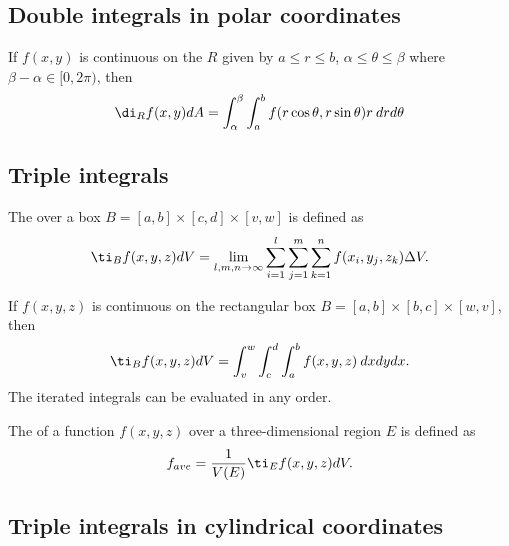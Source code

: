 \documentclass{article}
\begin{document}
\subsection{Double integrals in polar coordinates}


\begin{theorem}
    If $f(x,y)$ is continuous on the  $R$
    given by $a\leq r \leq b$, $\alpha \leq \theta\leq \beta$ where
    $\beta-\alpha \in [0,2\pi)$, then
    \begin{align*}
        \di_R f(x,y)dA = \int_\alpha^\beta \int_a^b
        f(r\cos\theta, r\sin\theta)r\:drd\theta
    \end{align*}
\end{theorem}


\subsection{Triple integrals} 


\begin{definition}
    The  over a box $B=[a,b]\times[c,d]\times[v,w]$
    is defined as
    \begin{align*}
        \ti_B f(x,y,z)dV = \lim_{l,m,n\to\infty}\sum_{i=1}^l \sum_{j=1}^m \sum_{k=1}^n
        f(x_i,y_j,z_k)\Delta V.
    \end{align*}
\end{definition}
\begin{theorem}
    If $f(x,y,z)$ is continuous on the rectangular box $B=[a,b]\times[b,c]\times[w,v]$,
    then 
    \begin{align*}
        \ti_B f(x,y,z) dV = \int_v^w\int_c^d \int_a^b f(x,y,z)\:dxdydx.
    \end{align*} 
    The iterated integrals can be evaluated in any order.
\end{theorem}
\begin{definition}
    The  of a function $f(x,y,z)$ over a three-dimensional region $E$
    is defined as
    \begin{align*}
        f_{ave} = \frac{1}{V(E)}\ti_E f(x,y,z)dV.
    \end{align*} 
\end{definition}


\subsection{Triple integrals in cylindrical coordinates}
\end{document}
